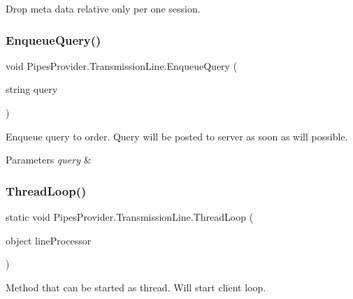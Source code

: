 Drop meta data relative only per one session. 

\mbox{\label{class_pipes_provider_1_1_transmission_line_ac27fedfbe0edfdcb4fbf4509c76f858f}} 
\subsubsection{\texorpdfstring{Enqueue\+Query()}{EnqueueQuery()}}
{\footnotesize\ttfamily void Pipes\+Provider.\+Transmission\+Line.\+Enqueue\+Query (\begin{DoxyParamCaption}\item[{string}]{query }\end{DoxyParamCaption})}



Enqueue query to order. Query will be posted to server as soon as will possible. 


\begin{DoxyParams}{Parameters}
{\em query} & \\
\hline
\end{DoxyParams}
\mbox{\label{class_pipes_provider_1_1_transmission_line_ab56219b10bad03085b5d23e48ad59ec3}} 
\subsubsection{\texorpdfstring{Thread\+Loop()}{ThreadLoop()}}
{\footnotesize\ttfamily static void Pipes\+Provider.\+Transmission\+Line.\+Thread\+Loop (\begin{DoxyParamCaption}\item[{object}]{line\+Processor }\end{DoxyParamCaption})\hspace{0.3cm}{\ttfamily [static]}}



Method that can be started as thread. Will start client loop. 


